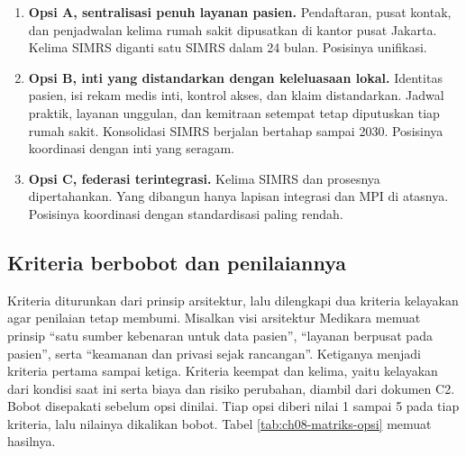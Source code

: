 \begin{enumerate}
  \item \textbf{Opsi A, sentralisasi penuh layanan pasien.} Pendaftaran, pusat kontak, dan
        penjadwalan kelima rumah sakit dipusatkan di kantor pusat Jakarta. Kelima SIMRS
        diganti satu SIMRS dalam 24 bulan. Posisinya unifikasi.
  \item \textbf{Opsi B, inti yang distandarkan dengan keleluasaan lokal.} Identitas pasien,
        isi rekam medis inti, kontrol akses, dan klaim distandarkan. Jadwal praktik, layanan
        unggulan, dan kemitraan setempat tetap diputuskan tiap rumah sakit. Konsolidasi
        SIMRS berjalan bertahap sampai 2030. Posisinya koordinasi dengan inti yang seragam.
  \item \textbf{Opsi C, federasi terintegrasi.} Kelima SIMRS dan prosesnya dipertahankan.
        Yang dibangun hanya lapisan integrasi dan MPI di atasnya. Posisinya koordinasi
        dengan standardisasi paling rendah.
\end{enumerate}

\subsection*{Kriteria berbobot dan penilaiannya}

Kriteria diturunkan dari prinsip arsitektur, lalu dilengkapi dua kriteria kelayakan agar
penilaian tetap membumi. Misalkan visi arsitektur Medikara memuat prinsip ``satu sumber
kebenaran untuk data pasien'', ``layanan berpusat pada pasien'', serta ``keamanan dan
privasi sejak rancangan''. Ketiganya menjadi kriteria pertama sampai ketiga. Kriteria
keempat dan kelima, yaitu kelayakan dari kondisi saat ini serta biaya dan risiko perubahan,
diambil dari dokumen C2. Bobot disepakati sebelum opsi dinilai. Tiap opsi diberi nilai 1
sampai 5 pada tiap kriteria, lalu nilainya dikalikan bobot. Tabel
\ref{tab:ch08-matriks-opsi} memuat hasilnya.

